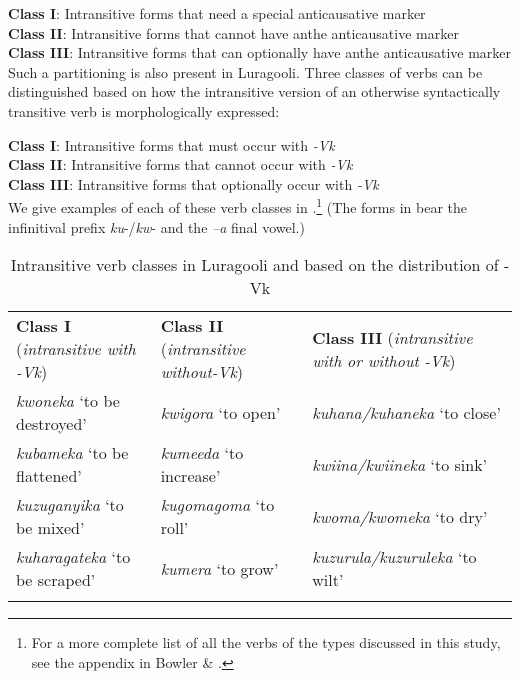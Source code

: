 \documentclass[output=paper]{langsci/langscibook}
\begin{document}
     \textbf{Class I}: Intransitive forms that need a special anticausative marker\\
     \textbf{Class II}: Intransitive forms that cannot have anthe anticausative marker\\
     \textbf{Class III}: Intransitive forms that can optionally have anthe anticausative marker\\
Such a partitioning is also present in Luragooli. Three classes of verbs can be distinguished based on how the intransitive %
version of an otherwise syntactically transitive verb is morphologically expressed:

     \textbf{Class I}: Intransitive forms that must occur with \textit{{}-}\textit{Vk}\\
     \textbf{Class II}: Intransitive forms that cannot occur with \textit{{}-}\textit{Vk}\\
     \textbf{Class III}: Intransitive forms that optionally occur with \textit{{}-}\textit{Vk}\\
We give examples of each of these verb classes in .\footnote{ For a more complete list of all the verbs of the types discussed in this study, see the appendix in Bowler \& \citet{Gluckman2015}.} (The forms in  bear the infinitival prefix \textit{ku}{}-/\textit{kw}{}- and the \textit{–a} final vowel.)

\begin{table}
\caption{Intransitive verb classes in Luragooli and based on the distribution of {}-Vk}


\begin{tabularx}{\textwidth}{XXX}
\lsptoprule

\textbf{Class I} (\textit{intransitive with }\textit{{}-}\textit{Vk}) & \textbf{Class II} (\textit{intransitive without}\textit{{}-}\textit{Vk})
 & \textbf{Class III} (\textit{intransitive with or without }\textit{{}-}\textit{Vk})\\
\textit{kwoneka} ‘to be destroyed’ & \textit{kwigora} ‘to open’ & \textit{kuhana}\textit{/}\textit{kuhaneka} ‘to close’\\
\textit{kubameka} ‘to be flattened’ & \textit{kumeeda} ‘to increase’ & \textit{kwiina}\textit{/}\textit{kwiineka} ‘to sink’\\
\textit{kuzuganyika} ‘to be mixed’ & \textit{kugomagoma} ‘to roll’ & \textit{kwoma}\textit{/}\textit{kwomeka} ‘to dry’\\
\textit{kuharagateka} ‘to be scraped’ & \textit{kumera} ‘to grow’ & \textit{kuzurula}\textit{/}\textit{kuzuruleka} ‘to wilt’\\
\lspbottomrule
\end{tabularx}
\label{tab:1}
\end{table} 
\end{document}
